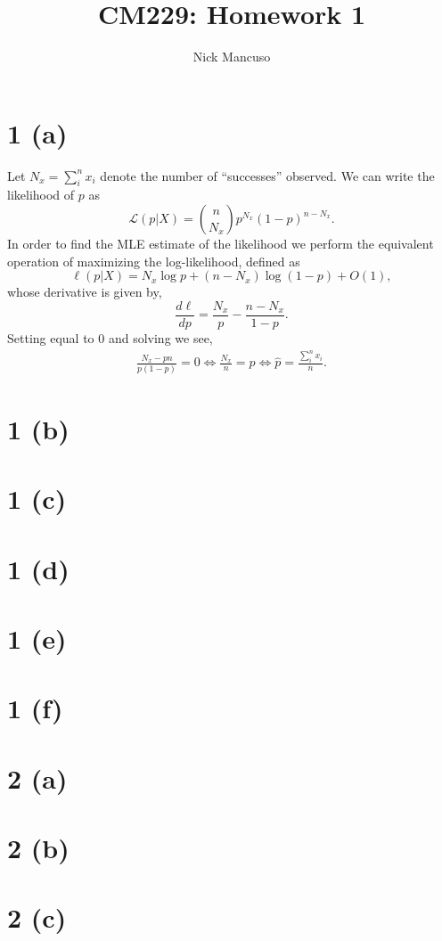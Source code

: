 \documentclass[10pt]{article}
\begin{document}
\title{CM229: Homework 1}
\author{Nick Mancuso}
\maketitle

\section*{1 (a)}
Let $N_x = \sum_i^n x_i$ denote the number of ``successes'' observed. We can write the
likelihood of $p$ as \[ \mathcal{L}(p| X) = {n \choose N_x} p^{N_x} (1 - p)^{n - N_x}.\] In order
to find the MLE estimate of the likelihood we perform the equivalent operation of maximizing the
log-likelihood, defined as \[\ell(p | X) = N_x \log p + (n - N_x) \log (1 - p) + O(1),\] whose
derivative is given by, \[ \frac{d \ell}{d p} = \frac{N_x}{p} - \frac{n - N_x}{1 - p}.\] Setting
equal to 0 and solving we see,
\begin{align*}
    \frac{N_x - pn}{p(1 - p)} = 0 \Leftrightarrow 
    \frac{N_x}{n} = p \Leftrightarrow 
    \hat{p} = \frac{\sum_i^n x_i}{n}.
\end{align*}
\section*{1 (b)}
\section*{1 (c)}
\section*{1 (d)}
\section*{1 (e)}
\section*{1 (f)}

\section*{2 (a)}
\section*{2 (b)}
\section*{2 (c)}
\end{document}
